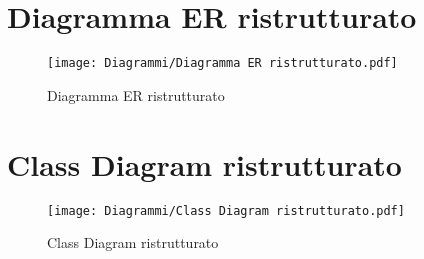     \newpage
    \section{Diagramma ER ristrutturato}
        \begin{figure}[htbp!]
            \centering
                \texttt{[image: Diagrammi/Diagramma ER ristrutturato.pdf]}
            \caption{Diagramma ER ristrutturato}
            \label{fig:Diagramma ER ristrutturato}
        \end{figure}

    \section{Class Diagram ristrutturato}
        \begin{figure}[htbp!]
            \centering
                \texttt{[image: Diagrammi/Class Diagram ristrutturato.pdf]}
            \caption{Class Diagram ristrutturato}
            \label{fig:Class Diagram ristrutturato}
        \end{figure}
    

